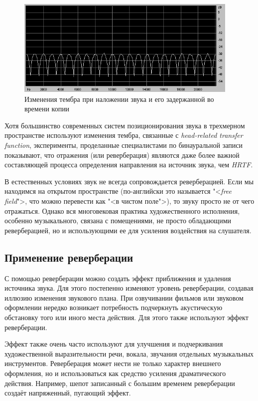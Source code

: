 \documentclass[oneside, final, 14pt]{extreport}
\begin{document}
\begin{figure}[h!]
  \centering
  \includegraphics[width=0.95\textwidth]{pic-rever-02}
  \caption{Изменения тембра при наложении звука и его задержанной во времени копии}
  \label{pic-rever-02}
\end{figure}

Хотя большинство современных систем позиционирования звука в трехмерном пространстве используют изменения тембра, связанные с \emph{head-related transfer function}, эксперименты, проделанные специалистами по бинауральной записи показывают, что отражения (или реверберация) являются даже более важной составляющей процесса определения направления на источник звука, чем \emph{HRTF}.

В естественных условиях звук не всегда сопровождается реверберацией. Если мы находимся на открытом пространстве (по-английски это называется "<\emph{free field}">, что можно перевести как "<в чистом поле">), то звуку просто не от чего отражаться. Однако вся многовековая практика художественного исполнения, особенно музыкального, связана с помещениями, не просто обладающими реверберацией, но и использующими ее для усиления воздействия на слушателя.

\subsection{Применение реверберации}
С помощью реверберации можно создать эффект приближения и удаления источника звука. Для этого постепенно изменяют уровень реверберации, создавая иллюзию изменения звукового плана. При озвучивании фильмов или звуковом оформлении нередко возникает потребность подчеркнуть акустическую обстановку того или иного места действия. Для этого также используют эффект реверберации.

Эффект также очень часто используют для улучшения и подчеркивания художественной выразительности речи, вокала, звучания отдельных музыкальных инструментов. Реверберация может нести не только характер внешнего оформления, но и использоваться как средство усиления драматического действия. Например, шепот записанный с большим временем реверберации создаёт напряженный, пугающий эффект.
\end{document}
